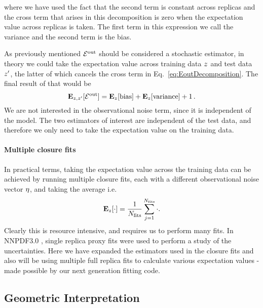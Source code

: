 where we have used the fact that the second term is constant across replicas and
the cross term that arises in this decomposition is zero when the expectation
value across replicas is taken. The first term in this expression we call the
variance and the second term is the bias.

As previously mentioned $\mathcal{E}^{\rm out}$ should be considered a stochastic estimator, in
theory we could take the expectation value across training data $z$ and
test data $z^{\prime}$, the latter of which cancels the cross term in
Eq.~\ref{eq:EoutDecomposition}. The final result of that would be
\begin{equation}\label{eq:ExpectedBiasVariance}
    \mathbf{E}_{z, z^\prime}[\mathcal{E}^{\rm out}] =
    \mathbf{E}_{z}[{\rm bias}] + 
    \mathbf{E}_{z}[{\rm variance}] + 1\, .
\end{equation}
We are not interested in the observational noise term, since it is
independent of the model. The two estimators of interest are independent of
the test data, and therefore we only need to take the expectation value on
the training data.
\paragraph{Multiple closure fits}
In practical terms, taking the expectation value across the training data can
be achieved by running multiple closure fits, each with a different
observational noise vector $\eta$, and taking the average i.e.
\begin{equation}
    \mathbf{E}_{z}[ \cdot ] = \frac{1}{N_{\rm fits}} \sum_{j=1}^{N_{\rm fits}} \cdot.
\end{equation}
Clearly this is resource intensive, and requires us to perform many fits. In
NNPDF3.0 \cite{nnpdf30}, single replica proxy fits were used to perform a study
of the uncertainties. Here we have expanded the estimators used in the closure
fits and also will be using multiple full replica fits to calculate various
expectation values - made possible by our next generation fitting code.

\subsection{Geometric Interpretation}

